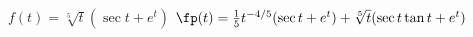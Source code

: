 {$ f(t) = \sqrt[5]{t}(\sec t + e^t)$
}
{$\fp(t) = \frac15t^{-4/5}(\sec t+ e^t) + \sqrt[5]{t}(\sec t\tan t + e^t)$
}
